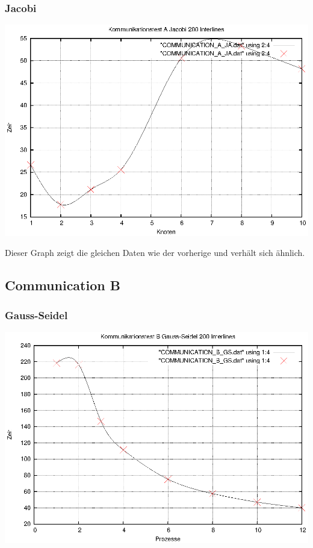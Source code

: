 \documentclass[a4paper,12pt]{scrartcl}
\begin{document}
\subsubsection{Jacobi}
\begin{multicols}{2}
\includegraphics[scale=0.5]{results/COMMUNICATION_A_JA.eps}

\end{multicols}

Dieser Graph zeigt die gleichen Daten wie der vorherige und verhält sich
ähnlich.

\subsection{Communication B}
\subsubsection{Gauss-Seidel}
\begin{multicols}{2}
\includegraphics[scale=0.5]{results/COMMUNICATION_B_GS.eps}

\end{multicols}
\end{document}
